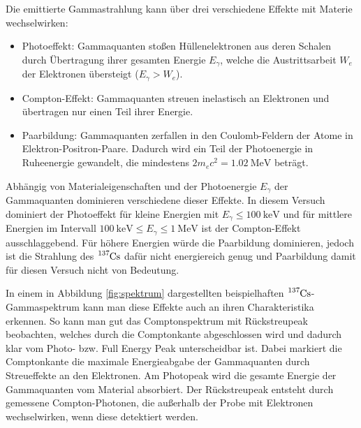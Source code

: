 Die emittierte Gammastrahlung kann über drei verschiedene Effekte mit Materie
wechselwirken:

\begin{itemize}
    \item Photoeffekt: Gammaquanten stoßen Hüllenelektronen aus deren Schalen durch Übertragung ihrer gesamten Energie $E_\gamma$,
    welche die Austrittsarbeit $W_e$ der Elektronen übersteigt ($E_\gamma > W_e$).
    \item Compton-Effekt: Gammaquanten streuen inelastisch an Elektronen und übertragen nur einen Teil ihrer Energie.
    \item Paarbildung: Gammaquanten zerfallen in den Coulomb-Feldern der Atome in Elektron-Positron-Paare. Dadurch
    wird ein Teil der Photoenergie in Ruheenergie gewandelt, die mindestens $2 m_e c^2 = \SI{1.02}{\mega\eV}$ beträgt.
\end{itemize}

Abhängig von Materialeigenschaften und der Photoenergie $E_\gamma$ der Gammaquanten dominieren verschiedene dieser Effekte. 
In diesem Versuch dominiert der Photoeffekt für kleine Energien mit $E_\gamma \leq \SI{100}{\kilo\eV}$ und für
mittlere Energien im Intervall $\SI{100}{\kilo\eV} \leq E_\gamma \leq \SI{1}{\mega\eV}$ ist der Compton-Effekt ausschlaggebend.
Für höhere Energien würde die Paarbildung dominieren, jedoch ist die Strahlung des $\ce{^{137}Cs}$ dafür nicht energiereich genug
und Paarbildung damit für diesen Versuch nicht von Bedeutung.

In einem in Abbildung \ref{fig:spektrum} dargestellten beispielhaften $\ce{^{137}Cs}$-Gammaspektrum kann man diese
Effekte auch an ihren Charakteristika erkennen. So kann man gut das Comptonspektrum mit Rückstreupeak beobachten, welches 
durch die Comptonkante abgeschlossen wird und dadurch klar vom Photo- bzw. Full Energy Peak unterscheidbar ist.
Dabei markiert die Comptonkante die maximale Energieabgabe der Gammaquanten durch Streueffekte an den Elektronen.
Am Photopeak wird die gesamte Energie der Gammaquanten vom Material absorbiert.
Der Rückstreupeak entsteht durch gemessene Compton-Photonen, die außerhalb der Probe mit Elektronen wechselwirken,
wenn diese detektiert werden.


